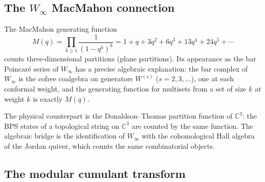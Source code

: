 \subsection{The $W_\infty$ MacMahon connection}

\begin{remark}
The MacMahon generating function
\[
M(q) = \prod_{k \ge 1} \frac{1}{(1-q^k)^k}
= 1 + q + 3q^2 + 6q^3 + 13q^4 + 24q^5 + \cdots
\]
counts three-dimensional partitions (plane partitions). Its appearance
as the bar Poincar\'e series of $W_\infty$ has a precise algebraic
explanation: the bar complex of $W_\infty$ is the cofree coalgebra on
generators $W^{(s)}$ ($s = 2,3,\dots$), one at each conformal weight,
and the generating function for multisets from a set of size $k$ at
weight $k$ is exactly $M(q)$.

The physical counterpart is the Donaldson--Thomas partition function of
$\mathbb{C}^3$: the BPS states of a topological string on $\mathbb{C}^3$
are counted by the same function. The algebraic bridge is the identification
of $W_\infty$ with the cohomological Hall algebra of the Jordan quiver,
which counts the same combinatorial objects.
\end{remark}

\subsection{The modular cumulant transform}

